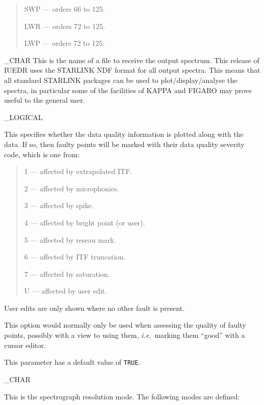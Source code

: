{{   \begin {quote}
   \begin {description}
      \item SWP --- orders 66 to 125.
      \item LWR --- orders 72 to 125.
      \item LWP --- orders 72 to 125.
   \end {description}
   \end {quote}
}

{
   \_CHAR
}{
   This is the name of a file to receive the output spectrum.
   This release of IUEDR uses the STARLINK NDF format for all output
   spectra. This means that all standard STARLINK packages can be used
   to plot/display/analyse the spectra, in particular some of the
   facilities of KAPPA and FIGARO may prove useful to the general user.
}

{
   \_LOGICAL
}{
   This specifies whether the data quality information is plotted
   along with the data.
   If so, then faulty points will be marked with their data quality
   severity code, which is one from:

   \begin {quote}
   \begin {description}
      \item 1 --- affected by extrapolated ITF.
      \item 2 --- affected by microphonics.
      \item 3 --- affected by spike.
      \item 4 --- affected by bright point (or user).
      \item 5 --- affected by reseau mark.
      \item 6 --- affected by ITF truncation.
      \item 7 --- affected by saturation.
      \item U --- affected by user edit.
   \end {description}
   \end {quote}

   User edits are only shown where no other fault is present.

   This option would normally only be used when assessing the quality
   of faulty points, possibly with a view to using them, {\it{i.e.}}\ marking
   them ``good'' with a cursor editor.

   This parameter has a default value of \verb+TRUE+\@.
}

{
   \_CHAR
}{
   This is the spectrograph resolution mode.
   The following modes are defined:

}}
